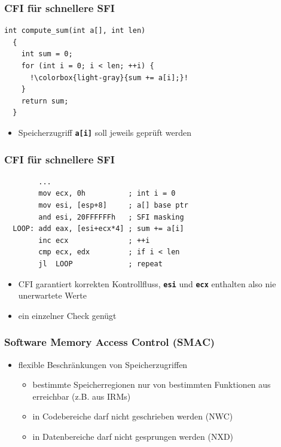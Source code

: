 \documentclass[mathserif,slidestop,compress,red]{beamer}
\begin{document}
\lstset{language=C}

\begin{frame}[fragile]
  \frametitle{CFI für schnellere SFI}
  \begin{lstlisting}[escapechar=!]
  int compute_sum(int a[], int len)
  {
    int sum = 0;
    for (int i = 0; i < len; ++i) {
      !\colorbox{light-gray}{sum += a[i];}!
    }
    return sum;
  }
  \end{lstlisting}
  \vspace{1em}
  \begin{itemize}
    \item Speicherzugriff \textbf{\texttt{a[i]}} soll jeweils geprüft werden
  \end{itemize}
\end{frame}

\lstset{language=[x86masm]Assembler}

\begin{frame}[fragile]
  \frametitle{CFI für schnellere SFI}
  \begin{lstlisting}
        ...
        mov ecx, 0h          ; int i = 0
        mov esi, [esp+8]     ; a[] base ptr
        and esi, 20FFFFFFh   ; SFI masking
  LOOP: add eax, [esi+ecx*4] ; sum += a[i]
        inc ecx              ; ++i
        cmp ecx, edx         ; if i < len
        jl  LOOP             ; repeat
  \end{lstlisting}
  \vspace{1em}
  \begin{itemize}
    \item CFI garantiert korrekten Kontrollfluss, \textbf{\texttt{esi}} und \textbf{\texttt{ecx}} enthalten also nie unerwartete Werte
    \item ein einzelner Check genügt
  \end{itemize}
\end{frame}


\begin{frame}
  \frametitle{Software Memory Access Control (SMAC)}
  \begin{itemize}
    \item flexible Beschränkungen von Speicherzugriffen
    \begin{itemize}
      \item bestimmte Speicherregionen nur von bestimmten Funktionen aus erreichbar (z.B. aus IRMs)
      \item in Codebereiche darf nicht geschrieben werden (NWC)
      \item in Datenbereiche darf nicht gesprungen werden (NXD)

    \end{itemize}
  \end{itemize}
\end{frame}
\end{document}
